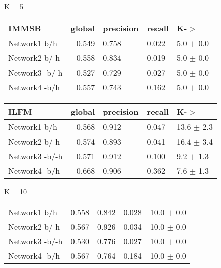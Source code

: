 \begin{table*}[h] \label{table:balanced}
\caption{Predictive Performance on a Balanced Testing set}
	\begin{minipage}[h]{0.45\linewidth} 
K =  5\hspace{5pt}
\begin{tabular}{lrlll}
\hline
 IMMSB   &   global &   precision &   recall &    K-\ensuremath{>} \\
\hline
 Network1 b/h          &    0.549 &       0.758 &    0.022 & 5.0 $\pm$ 0.0 \\
 Network2 b/-h        &    0.558 &       0.834 &    0.019 & 5.0 $\pm$ 0.0 \\
 Network3 -b/-h        &    0.527 &       0.729 &    0.027 & 5.0 $\pm$ 0.0 \\
 Network4 -b/h        &    0.557 &       0.743 &    0.162 & 5.0 $\pm$ 0.0 \\

\hline
\end{tabular}
\end{minipage}
\hspace{0.8cm}
\begin{minipage}[h]{0.45\linewidth}
\begin{tabular}{lrlll}
\hline
 ILFM   &   global &   precision &   recall &     K-\ensuremath{>} \\
\hline
 Network1 b/h        &    0.568 &       0.912 &    0.047 & 13.6 $\pm$ 2.3 \\
 Network2 b/-h      &    0.574 &       0.893 &    0.041 & 16.4 $\pm$ 3.4 \\
 Network3 -b/-h      &    0.571 &       0.912 &    0.100 & 9.2 $\pm$ 1.3 \\
 Network4 -b/h      &    0.668 &       0.906 &    0.362 & 7.6 $\pm$ 1.3 \\

\hline
\end{tabular}
\end{minipage}


	\begin{minipage}[h]{0.45\linewidth} 
K = 10
\begin{tabular}{lrrrr}
 Network1 b/h          &    0.558 &       0.842 &    0.028 & 10.0 $\pm$ 0.0 \\
 Network2 b/-h        &    0.567 &       0.926 &    0.034 & 10.0 $\pm$ 0.0 \\
 Network3 -b/-h        &    0.530 &       0.776 &    0.027 & 10.0 $\pm$ 0.0 \\
 Network4 -b/h        &    0.567 &       0.764 &    0.184 & 10.0 $\pm$ 0.0 \\


\end{tabular}
\end{minipage}
\end{table*}
